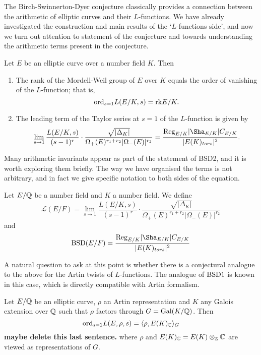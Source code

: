 The Birch-Swinnerton-Dyer conjecture classically provides a connection between the arithmetic of elliptic curves and their $L$-functions. We have already investigated the construction and main results of the `$L$-functions side', and now we turn out attention to statement of the conjecture and towards understanding the arithmetic terms present in the conjecture. 

\begin{conj}[BSD]
    Let $E$ be an elliptic curve over a number field $K$. Then 
    \begin{enumerate}[label={\bfseries  BSD\arabic*.}]
        \item The rank of the Mordell-Weil group of $E$ over $K$ equals the order of vanishing of the $L$-function; that is,
        $$\mathrm{ord}_{s=1}L(E/K,s)=\mathrm{rk} E/K.$$
        \item The leading term of the Taylor series at $s=1$ of the $L$-function is given by 
        \begin{align}\label{BSD_2}
            \lim_{s\to1}\frac{L(E/K,s)}{(s-1)^r}\cdot\frac{\sqrt{|\Delta_K|}}{\Omega_+(E)^{r_1+r_2}|\Omega_-(E)|^{r_2}}=\frac{\Reg_{E/K}|\Sha_{E/K}|C_{E/K}}{|E(K)_{tors}|^2}.
        \end{align}
    \end{enumerate}
\end{conj}

Many arithmetic invariants appear as part of the statement of BSD2, and it is worth exploring them briefly. The way we have organised the terms is not arbitrary, and in fact we give specific notation to both sides of the equation. 

\begin{notation}
    Let $E/\mathbb{Q}$ be a number field and $K$ a number field. We define 
    $$\mathcal{L}(E/F)=\lim_{s\to1}\frac{L(E/K,s)}{(s-1)^r}\cdot\frac{\sqrt{|\Delta_K|}}{\Omega_+(E)^{r_1+r_2}|\Omega_-(E)|^{r_2}}$$
    and
    $$\BSD(E/F)=\frac{\Reg_{E/K}|\Sha_{E/K}|C_{E/K}}{|E(K)_{tors}|^2}$$
\end{notation}

A natural question to ask at this point is whether there is a conjectural analogue to the above for the Artin twists of $L$-functions. The analogue of $\mathrm{BSD}1$ is known in this case, which is directly compatible with Artin formalism.

\begin{conj}
    Let $E/\mathbb{Q}$ be an elliptic curve, $\rho$ an Artin representation and $K$ any Galois extension over $\mathbb{Q}$ such that $\rho$ factors through $G=\mathrm{Gal}(K/\mathbb{Q})$. Then
    $$\mathrm{ord}_{s=1}L(E,\rho,s)=\langle\rho,E(K)_{\mathbb{C}}\rangle_G$$
    \textbf{maybe delete this last sentence.} where $\rho$ and $E(K)_{\mathbb{C}}=E(K)\otimes_{\mathbb{Z}}\mathbb{C}$ are viewed as representations of $G$.
\end{conj}


